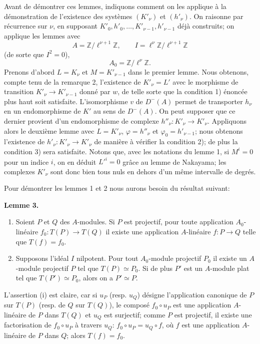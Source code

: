 \documentclass[11pt]{article}
\newenvironment{statement}[1]{\par\medskip\noindent\textbf{#1.}\ }{\par\medskip}
\begin{document}
Avant de démontrer ces lemmes, indiquons comment on les applique à la démonstration de l'existence des systèmes $(K'_\nu)$ et $(h'_\nu)$. On raisonne par récurrence sur $\nu$, en supposant $K'_0,h'_0,\ldots,K'_{\nu-1},h'_{\nu-1}$ déjà construits; on applique les lemmes avec
\[
A=\mathbb Z/\ell^{\nu+1}\mathbb Z,
\qquad
I=\ell^\nu\mathbb Z/\ell^{\nu+1}\mathbb Z
\]
(de sorte que $I^2=0$),
\[
A_0=\mathbb Z/\ell^\nu\mathbb Z.
\]
Prenons d'abord $L=K_\nu$ et $M=K'_{\nu-1}$ dans le premier lemme. Nous obtenons, compte tenu de la remarque 2, l'existence de $K'_\nu=L'$ avec le morphisme de transition $K'_\nu\to K'_{\nu-1}$ donné par $w$, de telle sorte que la condition 1) énoncée plus haut soit satisfaite. L'isomorphisme $v$ de $D^-(A)$ permet de transporter $h_\nu$ en un endomorphisme de $K'$ au sens de $D^-(A)$. On peut supposer que ce dernier provient d'un endomorphisme de complexe $h''_\nu:K'_\nu\to K'_\nu$. Appliquons alors le deuxième lemme avec $L=K'_\nu$, $\varphi=h''_\nu$ et $\varphi_0=h'_{\nu-1}$; nous obtenons l'existence de $h'_\nu:K'_\nu\to K'_\nu$ de manière à vérifier la condition 2); de plus la condition 3) sera satisfaite. Notons que, avec les notations du lemme 1, si $M^i=0$ pour un indice $i$, on en déduit $L'^i=0$ grâce au lemme de Nakayama; les complexes $K'_\nu$ sont donc bien tous nuls en dehors d'un même intervalle de degrés.

Pour démontrer les lemmes 1 et 2 nous aurons besoin du résultat suivant:

\begin{statement}{Lemme 3}
\begin{enumerate}[label=(\roman*)]
\item Soient $P$ et $Q$ des $A$-modules. Si $P$ est projectif, pour toute application $A_0$-linéaire $f_0:T(P)\to T(Q)$ il existe une application $A$-linéaire $f:P\to Q$ telle que $T(f)=f_0$.
\item Supposons l'idéal $I$ nilpotent. Pour tout $A_0$-module projectif $P_0$ il existe un $A$-module projectif $P$ tel que $T(P)\simeq P_0$. Si de plus $P'$ est un $A$-module plat tel que $T(P')\simeq P_0$, alors on a $P'\simeq P$.
\end{enumerate}
\end{statement}

L'assertion (i) est claire, car si $u_P$ (resp. $u_Q$) désigne l'application canonique de $P$ sur $T(P)$ (resp. de $Q$ sur $T(Q)$), le composé $f_0\circ u_P$ est une application $A$-linéaire de $P$ dans $T(Q)$ et $u_Q$ est surjectif; comme $P$ est projectif, il existe une factorisation de $f_0\circ u_P$ à travers $u_Q$: $f_0\circ u_P=u_Q\circ f$, où $f$ est une application $A$-linéaire de $P$ dans $Q$; alors $T(f)=f_0$.
\end{document}
